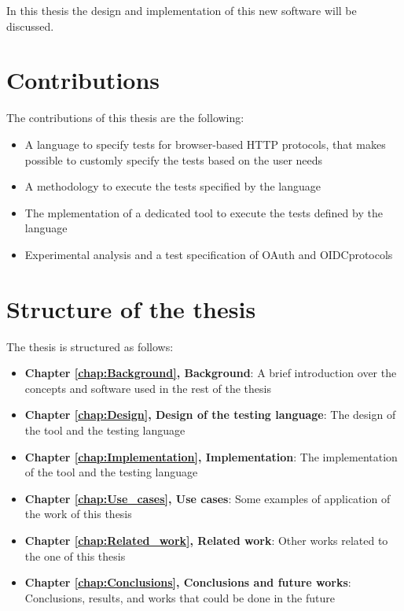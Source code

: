 In this thesis the design and implementation of this new software will be discussed.

\section{Contributions}
\label{sec:contributions}
The contributions of this thesis are the following:
\begin{itemize}
    \item A language to specify tests for browser-based HTTP protocols, that makes possible to customly specify the tests based on the user needs
    \item A methodology to execute the tests specified by the language
    \item The mplementation of a dedicated tool to execute the tests defined by the language
    \item Experimental analysis and a test specification of \gls{OAuth} and \gls{OIDC}protocols
\end{itemize}

\section{Structure of the thesis}
The thesis is structured as follows:
\begin{itemize}
    \item \textbf{Chapter \ref{chap:Background}, Background}: A brief introduction over the concepts and software used in the rest of the thesis
    \item \textbf{Chapter \ref{chap:Design}, Design of the testing language}: The design of the tool and the testing language
    \item \textbf{Chapter \ref{chap:Implementation}, Implementation}: The implementation of the tool and the testing language
    \item \textbf{Chapter \ref{chap:Use_cases}, Use cases}: Some examples of application of the work of this thesis
    \item \textbf{Chapter \ref{chap:Related_work}, Related work}: Other works related to the one of this thesis
    \item \textbf{Chapter \ref{chap:Conclusions}, Conclusions and future works}: Conclusions, results, and works that could be done in the future
\end{itemize}




